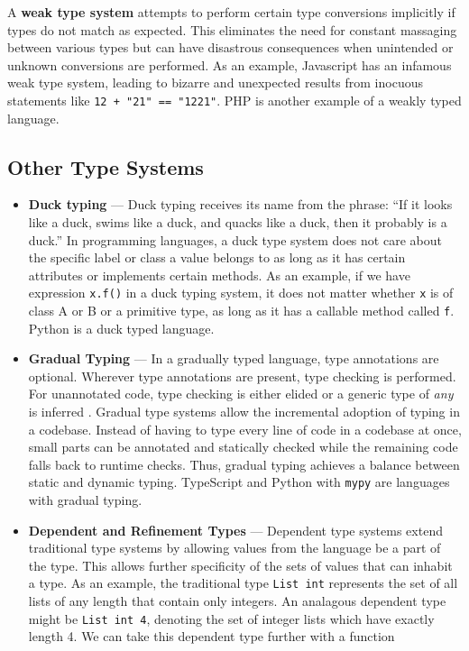 \documentclass[12pt]{report}
\begin{document}
A \textbf{weak type system} attempts to perform certain type conversions implicitly if types do not match as expected. This eliminates the need for constant massaging between various types but can have disastrous consequences when unintended or unknown conversions are performed. As an example, Javascript has an infamous weak type system, leading to bizarre and unexpected results from inocuous statements like \texttt{12 + "21" == "1221"}. PHP is another example of a weakly typed language.

\subsection{Other Type Systems}
\begin{itemize}

\item \textbf{Duck typing} --- Duck typing receives its name from the phrase: ``If it looks like a duck, swims like a duck, and quacks like a duck, then it probably is a duck.'' In programming languages, a duck type system does not care about the specific label or class a value belongs to as long as it has certain attributes or implements certain methods. As an example, if we have expression \texttt{x.f()} in a duck typing system, it does not matter whether \texttt{x} is of class A or B or a primitive type, as long as it has a callable method called \texttt{f}. Python is a duck typed language.

\item \textbf{Gradual Typing} --- In a gradually typed language, type annotations are optional. Wherever type annotations are present, type checking is performed. For unannotated code, type checking is either elided or a generic type of \textit{any} is inferred \cite{PythonDropbox}. Gradual type systems allow the incremental adoption of typing in a codebase. Instead of having to type every line of code in a codebase at once, small parts can be annotated and statically checked while the remaining code falls back to runtime checks. Thus, gradual typing achieves a balance between static and dynamic typing. TypeScript and Python with \texttt{mypy} are languages with gradual typing.

\item \textbf{Dependent and Refinement Types} --- Dependent type systems extend traditional type systems by allowing values from the language be a part of the type. This allows further specificity of the sets of values that can inhabit a type. As an example, the traditional type \texttt{List int} represents the set of all lists of any length that contain only integers. An analagous dependent type might be \texttt{List int 4}, denoting the set of integer lists which have exactly length 4. We can take this dependent type further with a function


\end{itemize}
\end{document}
